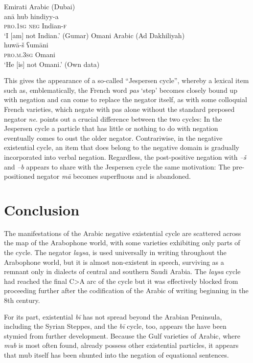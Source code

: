 \documentclass[output=paper]{langsci/langscibook}
\begin{document}
\ea \label{ex:WiAR-36}
  \ea Emirati Arabic (Dubai)\\
  	\gll anā hub hindiyy-a\\
  	\textsc{pro.1sg} \textsc{neg} Indian-\textsc{f}\\
  	\glt ‘I [am] not Indian.’ (Gumar)
  \ex Omani Arabic (Ad Dakhiliyah)\\
  	\gll huwā-š ʕumāni\\
  	\textsc{pro.m.3sg} Omani\\
  	\glt ‘He [is] not Omani.’ (Own data)
\z \z

This gives the appearance of a so-called “Jespersen cycle”, whereby a lexical item such as, emblematically, the French word \textit{pas} ‘step’ becomes closely bound up with negation and can come to replace the negator itself, as with some colloquial French varieties, which negate with pas alone without the standard preposed negator \textit{ne}. \citep[53]{Veselinova2016} points out a crucial difference between the two cycles: In the Jespersen cycle a particle that has little or nothing to do with negation eventually comes to oust the older negator. Contrariwise, in the negative existential cycle, an item that does belong to the negative domain is gradually incorporated into verbal negation. Regardless, the post-positive negation with \textit{–š} and \textit{–b} appears to share with the Jespersen cycle the same motivation: The pre-positioned negator \textit{mā} becomes superfluous and is abandoned.

\section{Conclusion} \label{s:WiAR-6}

The manifestations of the Arabic negative existential cycle are scattered across the map of the Arabophone world, with some varieties exhibiting only parts of the cycle. The negator \textit{laysa}, is used universally in writing throughout the Arabophone world, but it is almost non-existent in speech, surviving as a remnant only in dialects of central and southern Saudi Arabia. The \textit{laysa} cycle had reached the final C>A arc of the cycle but it was effectively blocked from proceeding further after the codification of the Arabic of writing beginning in the 8th century.

For its part, existential \textit{bī} has not spread beyond the Arabian Peninsula, including the Syrian Steppes, and the \textit{bī} cycle, too, appears the have been stymied from further development. Because the Gulf varieties of Arabic, where \textit{mub} is most often found, already possess other existential particles, it appears that mub itself has been shunted into the negation of equational sentences.
\end{document}
